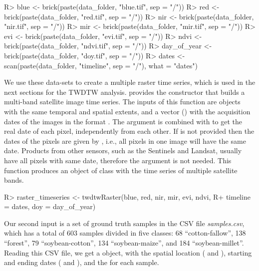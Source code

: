 \documentclass[article,shortnames]{jss}
\begin{document}
\begin{CodeChunk}

\begin{CodeInput}
R> blue <- brick(paste(data_folder, "blue.tif", sep = "/"))
R> red  <- brick(paste(data_folder,  "red.tif", sep = "/"))
R> nir  <- brick(paste(data_folder,  "nir.tif", sep = "/"))
R> mir  <- brick(paste(data_folder,  "mir.tif", sep = "/"))
R> evi  <- brick(paste(data_folder,  "evi.tif", sep = "/"))
R> ndvi <- brick(paste(data_folder, "ndvi.tif", sep = "/"))
R> day_of_year <- brick(paste(data_folder, "doy.tif", sep = "/"))
R> dates <- scan(paste(data_folder, "timeline", sep = "/"), what = "dates")
\end{CodeInput}
\end{CodeChunk}

We use these data-sets to create a multiple raster time series, which is
used in the next sections for the TWDTW analysis.  provides
the constructor  that builds a multi-band satellite
image time series. The inputs of this function are 
objects with the same temporal and spatial extents, and a vector
() with the acquisition dates of the images in the format
. The argument  is combined with
 to get the real date of each pixel, independently from
each other. If  is not provided then the dates of the pixels
are given by , i.e., all pixels in one image will have
the same date. Products from other sensors, such as the Sentinels and
Landsat, usually have all pixels with same date, therefore the argument
 is not needed. This function produces an object of class
 with the time series of multiple satellite bands.

\begin{CodeChunk}

\begin{CodeInput}
R> raster_timeseries <- twdtwRaster(blue, red, nir, mir, evi, ndvi, 
R+   timeline = dates, doy = day_of_year)
\end{CodeInput}
\end{CodeChunk}

Our second input is a set of ground truth samples in the CSV file
\emph{samples.csv}, which has a total of 603 samples divided in five
classes: 68 ``cotton-fallow'', 138 ``forest'', 79 ``soybean-cotton'',
134 ``soybean-maize'', and 184 ``soybean-millet''. Reading this CSV
file, we get a  object, with the spatial location
( and ), starting and ending dates
( and ), and the  for each sample.
\end{document}
